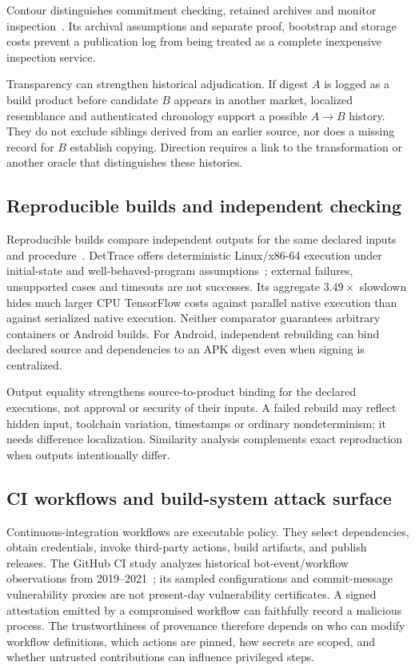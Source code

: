 Contour distinguishes commitment checking, retained archives and monitor inspection~\cite{contour}. Its archival assumptions and separate proof, bootstrap and storage costs prevent a publication log from being treated as a complete inexpensive inspection service.

Transparency can strengthen historical adjudication. If digest $A$ is logged as a build product before candidate $B$ appears in another market, localized resemblance and authenticated chronology support a possible $A\rightarrow B$ history. They do not exclude siblings derived from an earlier source, nor does a missing record for $B$ establish copying. Direction requires a link to the transformation or another oracle that distinguishes these histories.

\subsection{Reproducible builds and independent checking}

Reproducible builds compare independent outputs for the same declared inputs and procedure~\cite{reprobuilds}. DetTrace offers deterministic Linux/x86-64 execution under initial-state and well-behaved-program assumptions~\cite{reprocontainers}; external failures, unsupported cases and timeouts are not successes. Its aggregate $3.49\times$ slowdown hides much larger CPU TensorFlow costs against parallel native execution than against serialized native execution. Neither comparator guarantees arbitrary containers or Android builds. For Android, independent rebuilding can bind declared source and dependencies to an APK digest even when signing is centralized.

Output equality strengthens source-to-product binding for the declared executions, not approval or security of their inputs. A failed rebuild may reflect hidden input, toolchain variation, timestamps or ordinary nondeterminism; it needs difference localization. Similarity analysis complements exact reproduction when outputs intentionally differ.

\subsection{CI workflows and build-system attack surface}

Continuous-integration workflows are executable policy. They select dependencies, obtain credentials, invoke third-party actions, build artifacts, and publish releases. The GitHub CI study analyzes historical bot-event/workflow observations from 2019--2021~\cite{githubci}; its sampled configurations and commit-message vulnerability proxies are not present-day vulnerability certificates. A signed attestation emitted by a compromised workflow can faithfully record a malicious process. The trustworthiness of provenance therefore depends on who can modify workflow definitions, which actions are pinned, how secrets are scoped, and whether untrusted contributions can influence privileged steps.

